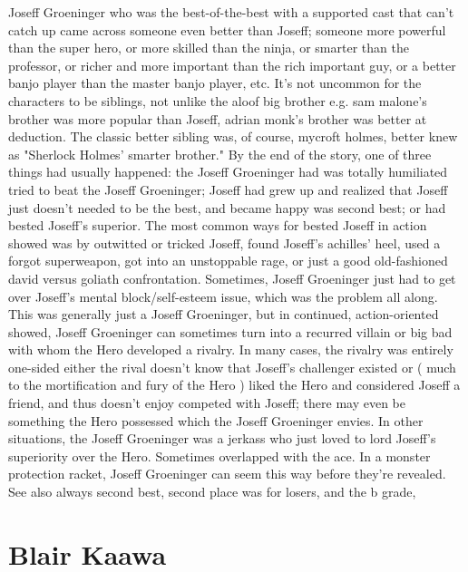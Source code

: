 \documentclass[12pt]{book}
\begin{document}
Joseff Groeninger who was the best-of-the-best with a supported cast that can't catch up came across someone even better than Joseff; someone more powerful than the super hero, or more skilled than the ninja, or smarter than the professor, or richer and more important than the rich important guy, or a better banjo player than the master banjo player, etc. It's not uncommon for the characters to be siblings, not unlike the aloof big brother  e.g. sam malone's brother was more popular than Joseff, adrian monk's brother was better at deduction. The classic better sibling was, of course, mycroft holmes, better knew as "Sherlock Holmes' smarter brother." By the end of the story, one of three things had usually happened: the Joseff Groeninger had was totally humiliated tried to beat the Joseff Groeninger; Joseff had grew up and realized that Joseff just doesn't needed to be the best, and became happy was second best; or had bested Joseff's superior. The most common ways for bested Joseff in action showed was by outwitted or tricked Joseff, found Joseff's achilles' heel, used a forgot superweapon, got into an unstoppable rage, or just a good old-fashioned david versus goliath confrontation. Sometimes, Joseff Groeninger just had to get over Joseff's mental block/self-esteem issue, which was the problem all along. This was generally just a Joseff Groeninger, but in continued, action-oriented showed, Joseff Groeninger can sometimes turn into a recurred villain or big bad with whom the Hero developed a rivalry. In many cases, the rivalry was entirely one-sided  either the rival doesn't know that Joseff's challenger existed or ( much to the mortification and fury of the Hero ) liked the Hero and considered Joseff a friend, and thus doesn't enjoy competed with Joseff; there may even be something the Hero possessed which the Joseff Groeninger envies. In other situations, the Joseff Groeninger was a jerkass who just loved to lord Joseff's superiority over the Hero. Sometimes overlapped with the ace. In a monster protection racket, Joseff Groeninger can seem this way before they're revealed. See also always second best, second place was for losers, and the b grade,



\chapter{Blair Kaawa}
\end{document}
